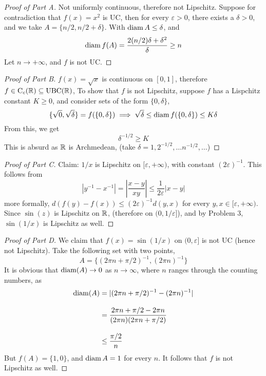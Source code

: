 \documentclass[../main.tex]{subfiles}
\begin{document}
\begin{proof}[Proof of Part A]
    Not uniformly continuous, therefore not Lipschitz. Suppose for contradiction that $f(x)=x^2$ is UC, then for every $\varepsilon>0$, there exists a $\delta>0$, and we take $A = \{n/2, n/2+\delta\}$. With $\operatorname{diam} A\leq \delta$, and\[\operatorname{diam} f(A)=\dfrac{2(n/2)\delta + \delta^2}{\delta}\geq n\]
    Let $n\to +\infty$, and $f$ is not UC.
\end{proof}
\begin{proof}[Proof of Part B]
    $f(x)=\sqrt{x}$ is continuous on $[0,1]$, therefore $f\in \operatorname{C}_c({\mathbb{R}})\subseteq {\operatorname{UBC}}(\mathbb{R})$, To show that $f$ is not Lipschitz, suppose $f$ has a Lispchitz constant $K\geq 0$, and consider sets of the form $\{0,\delta\}$, 
    \[\{\sqrt{0},\sqrt{\delta}\} = f(\{0,\delta\})\implies \sqrt{\delta}\leq \operatorname{diam} f(\{0,\delta\})\leq K\delta\]
    From this, we get \[\delta^{-1/2}\geq K\]
    This is absurd as $\mathbb{R}$ is Archmedean, (take $\delta = 1, 2^{-1/2},\ldots n^{-1/2},\ldots$)
\end{proof}
\begin{proof}[Proof of Part C]
    Claim: $1/x$ is Lipschitz on $[\varepsilon,+\infty)$, with constant $(2\varepsilon)^{-1}$. This follows from \[\left|y^{-1}-x^{-1}\right|=\left|\dfrac{x-y}{xy}\right|\leq \dfrac{1}{2\varepsilon}|x-y|\]
    more formally, $d(f(y)-f(x))\leq (2\varepsilon)^{-1}d(y,x)$ for every $y,x\in [\varepsilon,+\infty)$. Since $\sin(z)$ is Lipschitz on $\mathbb{R}$, (therefore on $(0,1/\varepsilon]$), and by Problem 3, $\sin(1/x)$ is Lipschitz as well.
\end{proof}
\begin{proof}[Proof of Part D]
    We claim that $f(x)=\sin(1/x)$ on $(0,\varepsilon]$ is not UC (hence not Lipschitz). Take the following set with two points,
    \[A=\biggl\{(2\pi n+ \pi/2)^{-1},(2\pi n)^{-1}\biggr\}\]
    It is obvious that $\operatorname{diam} (A)\to 0$ as $n\to\infty$, where $n$ ranges through the counting numbers, as 
    \begin{align*}
        \operatorname{diam}(A)&= |(2\pi n+ \pi/2)^{-1}-(2\pi n)^{-1}|\\[2ex]
        &= \dfrac{2\pi n + \pi/2 - 2\pi n}{(2\pi n)(2\pi n + \pi/2)}\\[2ex]
        &\leq \dfrac{\pi/2}{n}
    \end{align*}
    But $f(A)=\{1,0\}$, and $\operatorname{diam} A=1$ for every $n$. It follows that $f$ is not Lipschitz as well.
\end{proof}
\end{document}
